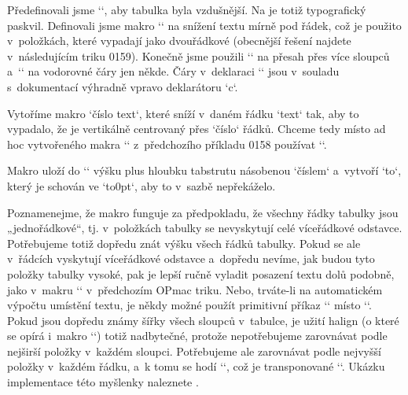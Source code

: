 Předefinovali jsme `\tabstrut`, aby tabulka byla vzdušnější. Na  je totiž typografický paskvil. Definovali jsme makro `\low` na snížení textu mírně pod řádek, což je použito v~položkách, které vypadají jako dvouřádkové (obecnější řešení najdete v~následujícím triku 0159). Konečně jsme použili `\mspan` na přesah přes více sloupců a~`\crlp` na vodorovné čáry jen někde. Čáry v~deklaraci `\mspan` jsou v~souladu s~dokumentací výhradně vpravo deklarátoru `c`. 


 


Vytoříme makro `\crow číslo {text}`, které sníží v~daném řádku `text` tak, aby to vypadalo, že je vertikálně centrovaný přes `číslo` řádků. Chceme tedy místo ad hoc vytvořeného makra `` z~předchozího příkladu 0158 používat ``. 

\begtt
\def\crow{\afterassignment\crowA \tmpnum=} 
\def\crowA#1{\setbox0=\hbox{\tabstrut}\tmpdim=\ht0 \advance\tmpdim by\dp0 
   \tmpdim=\the\tmpnum\tmpdim 
   \vbox to0pt{\kern-\ht0 \vbox to\tmpdim{\vss\hbox{#1}\kern-\prevdepth\vss}\vss}%
} 
\endtt


Makro uloží do `\tmpdim` výšku plus hloubku tabstrutu násobenou `číslem` a~vytvoří `\vbox to\tmpdim`, který je schován ve `\vbox to0pt`, aby to v~sazbě nepřekáželo. 



Poznamenejme, že makro funguje za předpokladu, že všechny řádky tabulky jsou „jednořádkové“, tj. v~položkách tabulky se nevyskytují celé víceřádkové odstavce. Potřebujeme totiž dopředu znát výšku všech řádků tabulky. Pokud se ale v~řádcích vyskytují víceřádkové odstavce a~dopředu nevíme, jak budou tyto položky tabulky vysoké, pak je lepší ručně vyladit posazení textu dolů podobně, jako v~makru `\low` v~předchozím OPmac triku. Nebo, trváte-li na automatickém výpočtu umístění textu, je někdy možné použít primitivní příkaz `\valign` místo `\halign`. Pokud jsou dopředu známy šířky všech sloupců v~tabulce, je užití {\tt{}}halign (o které se opírá i~makro `\table`) totiž nadbytečné, protože nepotřebujeme zarovnávat podle nejširší položky v~každém sloupci. Potřebujeme ale zarovnávat podle nejvyšší položky v~každém řádku, a~k tomu se hodí `\valign`, což je transponované `\halign`. Ukázku implementace této myšlenky naleznete . 


